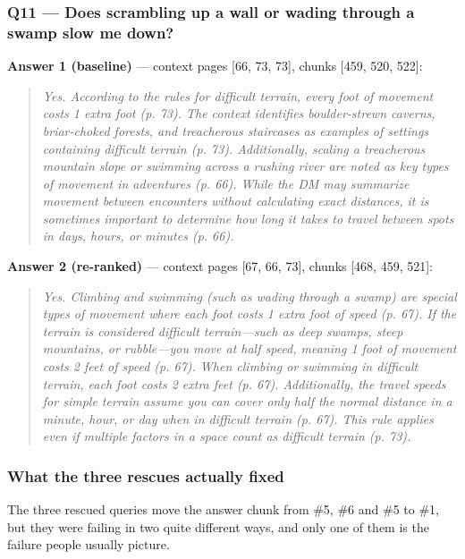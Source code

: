 \documentclass[11pt,a4paper]{article}
\begin{document}
\subsubsection*{Q11 --- Does scrambling up a wall or wading through a swamp slow me down?}
\textbf{Answer 1 (baseline)} --- context pages [66, 73, 73], chunks [459, 520, 522]:
\begin{quote}\itshape Yes. According to the rules for difficult terrain, every foot of movement costs 1 extra foot (p. 73). The context identifies boulder-strewn caverns, briar-choked forests, and treacherous staircases as examples of settings containing difficult terrain (p. 73). Additionally, scaling a treacherous mountain slope or swimming across a rushing river are noted as key types of movement in adventures (p. 66). While the DM may summarize movement between encounters without calculating exact distances, it is sometimes important to determine how long it takes to travel between spots in days, hours, or minutes (p. 66).\end{quote}
\textbf{Answer 2 (re-ranked)} --- context pages [67, 66, 73], chunks [468, 459, 521]:
\begin{quote}\itshape Yes. Climbing and swimming (such as wading through a swamp) are special types of movement where each foot costs 1 extra foot of speed (p. 67). If the terrain is considered difficult terrain---such as deep swamps, steep mountains, or rubble---you move at half speed, meaning 1 foot of movement costs 2 feet of speed (p. 67). When climbing or swimming in difficult terrain, each foot costs 2 extra feet (p. 67). Additionally, the travel speeds for simple terrain assume you can cover only half the normal distance in a minute, hour, or day when in difficult terrain (p. 67). This rule applies even if multiple factors in a space count as difficult terrain (p. 73).\end{quote}

\subsubsection*{What the three rescues actually fixed}

The three rescued queries move the answer chunk from \#5, \#6 and \#5 to \#1,
but they were failing in two quite different ways, and only one of them is the
failure people usually picture.
\end{document}
